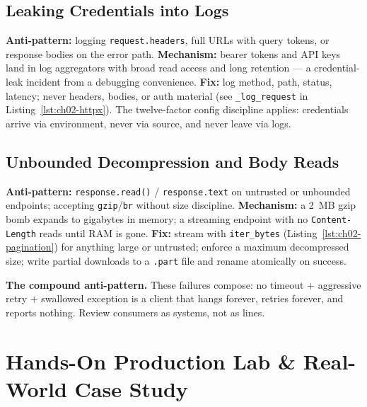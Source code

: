 \subsection{Leaking Credentials into Logs}

\textbf{Anti-pattern:} logging \texttt{request.headers}, full URLs with query
tokens, or response bodies on the error path. \textbf{Mechanism:} bearer
tokens and API keys land in log aggregators with broad read access and long
retention --- a credential-leak incident from a debugging convenience.
\textbf{Fix:} log method, path, status, latency; never headers, bodies, or
auth material (see \texttt{\_log\_request} in Listing~\ref{lst:ch02-httpx}).
The twelve-factor config discipline \cite{twelvefactor} applies: credentials
arrive via environment, never via source, and never leave via logs.

\subsection{Unbounded Decompression and Body Reads}

\textbf{Anti-pattern:} \texttt{response.read()} / \texttt{response.text} on
untrusted or unbounded endpoints; accepting \texttt{gzip}/\texttt{br} without
size discipline. \textbf{Mechanism:} a 2~MB gzip bomb expands to gigabytes in
memory; a streaming endpoint with no \texttt{Content-Length} reads until RAM
is gone. \textbf{Fix:} stream with \texttt{iter\_bytes}
(Listing~\ref{lst:ch02-pagination}) for anything large or untrusted; enforce a
maximum decompressed size; write partial downloads to a \texttt{.part} file
and rename atomically on success.

\begin{warningbox}
\textbf{The compound anti-pattern.} These failures compose: no timeout +
aggressive retry + swallowed exception is a client that hangs forever, retries
forever, and reports nothing. Review consumers as systems, not as lines.
\end{warningbox}


\section{Hands-On Production Lab \& Real-World Case Study}
\label{sec:ch02-lab}

